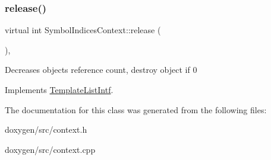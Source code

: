 \mbox{\label{class_symbol_indices_context_a9912083441aa4e5f250ecbbc088cf275}} 
\subsubsection{\texorpdfstring{release()}{release()}}
{\footnotesize\ttfamily virtual int Symbol\+Indices\+Context\+::release (\begin{DoxyParamCaption}{ }\end{DoxyParamCaption})\hspace{0.3cm}{\ttfamily [inline]}, {\ttfamily [virtual]}}

Decreases object\textquotesingle{}s reference count, destroy object if 0 

Implements \mbox{\hyperlink{class_template_list_intf_a0c53169c740c09dac47efc62bbe39674}{Template\+List\+Intf}}.



The documentation for this class was generated from the following files\+:\begin{DoxyCompactItemize}
\item 
doxygen/src/context.\+h\item 
doxygen/src/context.\+cpp\end{DoxyCompactItemize}
